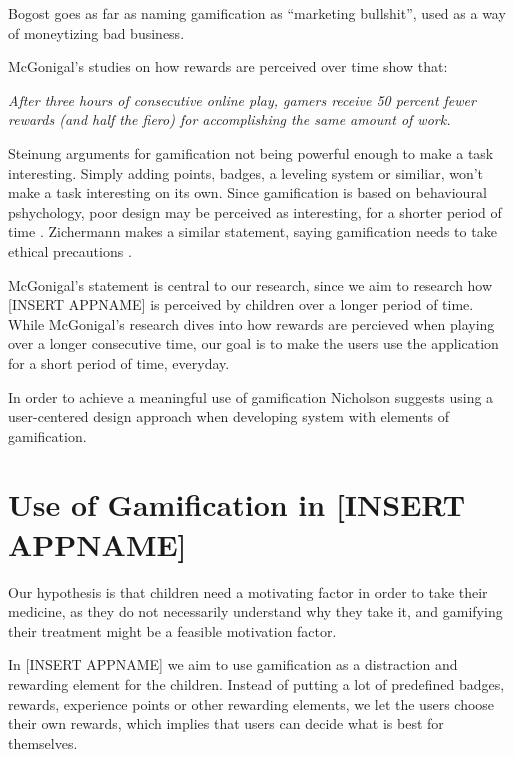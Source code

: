 Bogost goes as far as naming gamification as ``marketing bullshit''\cite{gamificationbullshit}, used as a way of moneytizing bad business.

McGonigal's studies\cite{jane2011reality} on how rewards are perceived over time show that: 

\textit{After three hours of consecutive online play, gamers receive 50 percent fewer rewards (and half the fiero) for accomplishing the same amount of work.}

Steinung\cite{steinung2012interessante} arguments for gamification not being powerful enough to make a task interesting. Simply adding points, badges, a leveling system or similiar, won't make a task interesting on its own. Since gamification is based on behavioural pshychology, poor design may be perceived as interesting, for a shorter period of time \cite{steinung2012interessante}. Zichermann makes a similar statement, saying gamification needs to take ethical precautions \cite{zichermann2011gamification}.

McGonigal's statement is central to our research, since we aim to research how [INSERT APPNAME] is perceived by children over a longer period of time. While McGonigal's research dives into how rewards are percieved when playing over a longer consecutive time, our goal is to make the users use the application for a short period of time, everyday.

In order to achieve a meaningful use of gamification Nicholson\cite{nicholson2012user} suggests using a user-centered design approach\cite{usercentereddesign} when developing system with elements of gamification. 

\section{Use of Gamification in [INSERT APPNAME]}

Our hypothesis is that children need a motivating factor in order to take their medicine, as they do not necessarily understand why they take it, and gamifying their treatment might be a feasible motivation factor.  


In [INSERT APPNAME] we aim to use gamification as a distraction and rewarding element for the children. Instead of putting a lot of predefined badges, rewards, experience points or other rewarding elements, we let the users choose their own rewards, which implies that users can decide what is best for themselves.  
 

